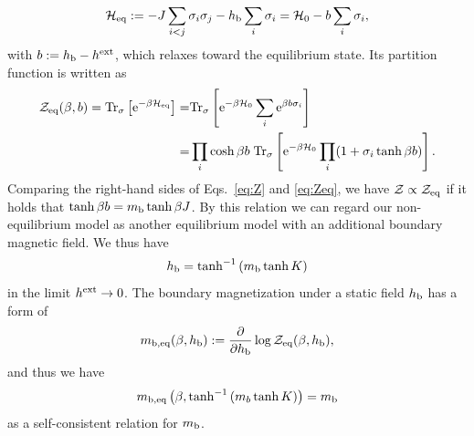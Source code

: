 \begin{align}
\mathcal{H}_{\rm eq}:=-J\sum_{i<j}\sigma_{i}\sigma_{j}-h_{\rm b}\sum_{i}\sigma_{i}=\mathcal{H}_{0} - b\sum_{i}\sigma_{i},
\end{align}
with $b:=h_{\rm b}-h^{\rm ext}$, which relaxes toward the equilibrium state. Its partition function is written as
\begin{align}
\mathcal{Z}_{\rm eq}(\beta,b)=\mathrm{Tr}_{\sigma}\left[\mathrm{e}^{-\beta\mathcal{H}_{\rm eq}}\right]=&\mathrm{Tr}_{\sigma}\left[\mathrm{e}^{-\beta \mathcal{H}_{0}}\sum_{i}\mathrm{e}^{\beta b\sigma_{i}}\right]\\
=&\prod_{i}\cosh \beta b\;\mathrm{Tr}_{\sigma}\left[\mathrm{e}^{-\beta\mathcal{H}_{0}}\prod_{i}(1+\sigma_{i}\tanh \beta b)\right].\label{eq:Zeq}
\end{align}
Comparing the right-hand sides of Eqs.~\eqref{eq:Z} and \eqref{eq:Zeq}, we have $\mathcal{Z} \propto\mathcal{Z}_{\rm eq}$ if it holds that $\tanh\beta b=m_{\rm b}\tanh \beta J$. By this relation we can regard our non-equilibrium model as another equilibrium model with an additional boundary magnetic field. We thus have
\begin{align}
h_{\rm b}=\tanh^{-1}\left(m_{\rm b}\tanh K\right)
\end{align}
in the limit $h^{\rm ext}\to 0$.
The boundary magnetization under a static field $h_{\rm b}$ has a form of
\begin{align}
m_{\rm b, eq}(\beta,h_{\rm b}):=\frac{\partial}{\partial h_{\rm b}}\log\mathcal{Z}_{\rm eq}(\beta,h_{\rm b}),
\end{align}
and thus we have
\begin{align}
m_{\rm b, eq}\left(\beta,\tanh^{-1}\left(m_{b}\tanh K\right)\right)=m_{\rm b}\label{cond:critcond1}
\end{align}
as a self-consistent relation for $m_{\rm b}$. 

